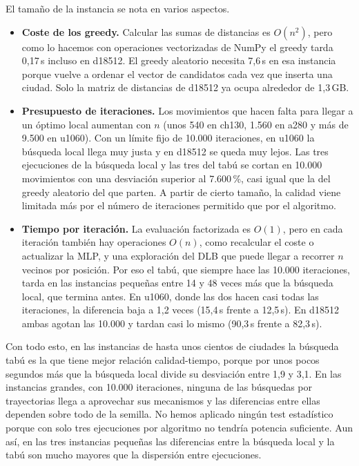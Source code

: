 El tamaño de la instancia se nota en varios aspectos.
\begin{itemize}
    \item \textbf{Coste de los greedy.} Calcular las sumas de distancias es $O(n^2)$, pero como lo hacemos con operaciones vectorizadas de NumPy el greedy tarda 0,17\,s incluso en d18512. El greedy aleatorio necesita 7,6\,s en esa instancia porque vuelve a ordenar el vector de candidatos cada vez que inserta una ciudad. Solo la matriz de distancias de d18512 ya ocupa alrededor de 1,3\,GB.
    \item \textbf{Presupuesto de iteraciones.} Los movimientos que hacen falta para llegar a un óptimo local aumentan con $n$ (unos 540 en ch130, 1.560 en a280 y más de 9.500 en u1060). Con un límite fijo de 10.000 iteraciones, en u1060 la búsqueda local llega muy justa y en d18512 se queda muy lejos. Las tres ejecuciones de la búsqueda local y las tres del tabú se cortan en 10.000 movimientos con una desviación superior al 7.600\,\%, casi igual que la del greedy aleatorio del que parten. A partir de cierto tamaño, la calidad viene limitada más por el número de iteraciones permitido que por el algoritmo.
    \item \textbf{Tiempo por iteración.} La evaluación factorizada es $O(1)$, pero en cada iteración también hay operaciones $O(n)$, como recalcular el coste o actualizar la MLP, y una exploración del DLB que puede llegar a recorrer $n$ vecinos por posición. Por eso el tabú, que siempre hace las 10.000 iteraciones, tarda en las instancias pequeñas entre 14 y 48 veces más que la búsqueda local, que termina antes. En u1060, donde las dos hacen casi todas las iteraciones, la diferencia baja a 1,2 veces (15,4\,s frente a 12,5\,s). En d18512 ambas agotan las 10.000 y tardan casi lo mismo (90,3\,s frente a 82,3\,s).
\end{itemize}

Con todo esto, en las instancias de hasta unos cientos de ciudades la búsqueda tabú es la que tiene mejor relación calidad-tiempo, porque por unos pocos segundos más que la búsqueda local divide su desviación entre 1,9 y 3,1. En las instancias grandes, con 10.000 iteraciones, ninguna de las búsquedas por trayectorias llega a aprovechar sus mecanismos y las diferencias entre ellas dependen sobre todo de la semilla. No hemos aplicado ningún test estadístico porque con solo tres ejecuciones por algoritmo no tendría potencia suficiente. Aun así, en las tres instancias pequeñas las diferencias entre la búsqueda local y la tabú son mucho mayores que la dispersión entre ejecuciones.

